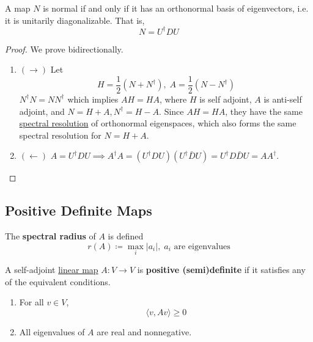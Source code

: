 	\begin{theorem}[]
	  \label{thm:map-normal-only-orthonormal-basis}
    A map $N$ is normal if and only if it has an orthonormal basis of eigenvectors, i.e. it is unitarily diagonalizable. That is, 
    \begin{equation}
      N = U^\dagger D U 
    \end{equation}
  \end{theorem}
  \begin{proof}
		We prove bidirectionally. 
		\begin{enumerate}
		  \item $(\rightarrow)$ Let 
				\begin{equation}
					H = \frac{1}{2} (N + N^\dagger), \; A = \frac{1}{2} (N - N^\dagger)
				\end{equation}
				$N^\dagger N = N N^\dagger$ which implies $A H = H A$, where $H$ is self adjoint, $A$ is anti-self adjoint, and $N = H + A, N^\dagger = H - A$. Since $A H = H A$, they have the same \hyperref[def:spectral-resolution]{spectral resolution} of orthonormal eigenspaces, which also forms the same spectral resolution for $N = H + A$. 

			\item $(\leftarrow)$ $A = U^\dagger D U \implies A^\dagger A = (U^\dagger D U) (U^\dagger \bar{D} U) = U^\dagger D \bar{D} U = A A^\dagger$. 
		\end{enumerate}
  \end{proof}

\subsection{Positive Definite Maps}

  \begin{definition}
    \label{def:spectral-radius}
    The \textbf{spectral radius} of $A$ is defined
    \begin{equation}
      r(A) \coloneqq \max_i |a_i|, \; a_i \text{ are eigenvalues}
    \end{equation}
  \end{definition}

  \begin{definition}
    \label{def:positive-semi-definite}
 
		A self-adjoint \hyperref[def:linear_map]{linear map} $A: V \to V$ is \textbf{positive (semi)definite} if it satisfies any of the equivalent conditions. 
		\begin{enumerate}
		  \item For all $v \in V$, 
				\begin{equation}
					\langle v, A v \rangle \geq 0
				\end{equation}

			\item All eigenvalues of $A$ are real and nonnegative. 
		\end{enumerate}
  \end{definition}

